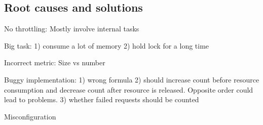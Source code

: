 \subsection{Root causes and solutions}

No throttling: Mostly involve internal tasks

Big task: 1) consume a lot of memory 2) hold lock for a long time

Incorrect metric: Size vs number

Buggy implementation: 1) wrong formula 2) should increase count before resource consumption and decrease count after resource is released. Opposite order could lead to problems. 3) whether failed requests should be counted

Misconfiguration